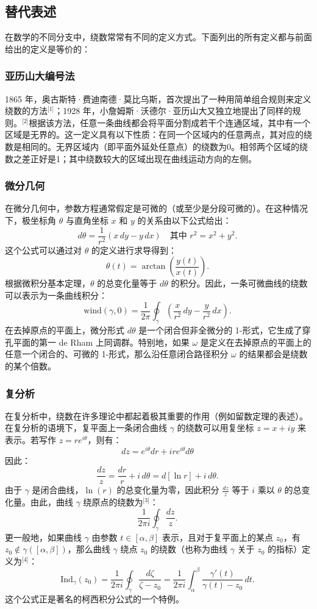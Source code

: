 \subsection{替代表述}
在数学的不同分支中，绕数常常有不同的定义方式。下面列出的所有定义都与前面给出的定义是等价的：
\subsubsection{亚历山大编号法}
1865 年，奥古斯特·费迪南德·莫比乌斯，首次提出了一种用简单组合规则来定义绕数的方法\(^\text{[1]}\)；1928 年，小詹姆斯·沃德尔·亚历山大又独立地提出了同样的规则。\(^\text{[2]}\)根据该方法，任意一条曲线都会将平面分割成若干个连通区域，其中有一个区域是无界的。这一定义具有以下性质：在同一个区域内的任意两点，其对应的绕数是相同的。无界区域内（即平面外延处任意点）的绕数为0。相邻两个区域的绕数之差正好是1；其中绕数较大的区域出现在曲线运动方向的左侧。
\subsubsection{微分几何}
在微分几何中，参数方程通常假定是可微的（或至少是分段可微的）。在这种情况下，极坐标角 $\theta$ 与直角坐标 $x$ 和 $y$ 的关系由以下公式给出：
$$
d\theta = \frac{1}{r^{2}}\left(x\,dy - y\,dx\right)
\quad\text{其中 } r^{2} = x^{2} + y^{2}.~
$$
这个公式可以通过对 $\theta$ 的定义进行求导得到：
$$
\theta(t) = \arctan\!\left(\frac{y(t)}{x(t)}\right).~
$$
根据微积分基本定理，$\theta$ 的总变化量等于 $d\theta$ 的积分。因此，一条可微曲线的绕数可以表示为一条曲线积分：
$$
\text{wind}(\gamma, 0) = 
\frac{1}{2\pi} 
\oint_{\gamma} 
\left(\frac{x}{r^{2}}\,dy - \frac{y}{r^{2}}\,dx\right).~
$$
在去掉原点的平面上，微分形式 $d\theta$ 是一个闭合但非全微分的 1-形式，它生成了穿孔平面的第一 de Rham 上同调群。特别地，如果 $\omega$ 是定义在去掉原点的平面上的任意一个闭合的、可微的 1-形式，那么沿任意闭合路径积分 $\omega$ 的结果都会是绕数的某个倍数。
\subsubsection{复分析}
在复分析中，绕数在许多理论中都起着极其重要的作用（例如留数定理的表述）。在复分析的语境下，复平面上一条闭合曲线 $\gamma$ 的绕数可以用复坐标 $z = x + iy$ 来表示。若写作 $z = r e^{i\theta}$，则有：
$$
dz = e^{i\theta}dr + i r e^{i\theta} d\theta~
$$
因此：
$$
\frac{dz}{z} = \frac{dr}{r} + i\,d\theta = d[\ln r] + i\,d\theta.~
$$
由于 $\gamma$ 是闭合曲线，$\ln(r)$ 的总变化量为零，因此积分 $\frac{dz}{z}$ 等于 $i$ 乘以 $\theta$ 的总变化量。由此，曲线 $\gamma$ 绕原点的绕数为\(^\text{[3]}\)：
$$
\frac{1}{2\pi i} \oint_{\gamma} \frac{dz}{z}.~
$$
更一般地，如果曲线 $\gamma$ 由参数 $t \in [\alpha, \beta]$ 表示，且对于复平面上的某点 $z_0$，有 $z_0 \notin \gamma([\alpha, \beta])$，那么曲线 $\gamma$ 绕点 $z_0$ 的绕数（也称为曲线 $\gamma$ 关于 $z_0$ 的指标）定义为\(^\text{[4]}\)：
$$
\mathrm{Ind}_{\gamma}(z_0)
= \frac{1}{2\pi i} \oint_{\gamma} \frac{d\zeta}{\zeta - z_0}
= \frac{1}{2\pi i} \int_{\alpha}^{\beta} 
\frac{\gamma'(t)}{\gamma(t) - z_0}\, dt.~
$$
这个公式正是著名的柯西积分公式的一个特例。

